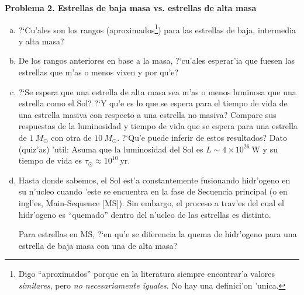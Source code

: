 \documentclass{article}
\begin{document}
\textbf{Problema 2. Estrellas de baja masa vs. estrellas de alta masa}

\vspace{3mm}


\begin{enumerate}[a)]
\item ?`Cu'ales son los rangos (aproximados\footnote{Digo ``aproximados'' porque en la literatura siempre encontrar'a valores \emph{similares}, pero \emph{no necesariamente iguales}. No hay una definici'on 'unica.}) para las estrellas de baja, intermedia y alta masa?

\item De los rangos anteriores en base a la masa, ?`cu'ales esperar'ia que fuesen las estrellas que m'as o menos viven y por qu'e?


\item ?`Se espera que una estrella de alta masa sea m'as o menos luminosa que una estrella como el Sol? ?`Y qu'e es lo que se espera para el tiempo de vida de una estrella masiva con respecto a una estrella no masiva? Compare sus respuestas de la luminosidad y tiempo de vida que se espera para una estrella de $1 \ M_\odot$ con otra de $10 \ M_\odot$. ?`Qu'e puede inferir de estos resultados? Dato (quiz'as) 'util: Asuma que la luminosidad del Sol es $L \sim 4 \times 10^{26} \ \text{W}$ y su tiempo de vida es $\tau_\odot \approx 10^{10} \ \text{yr}$.

\item Hasta donde sabemos, el Sol est'a constantemente fusionando hidr'ogeno en su n'ucleo cuando 'este se encuentra en la fase de Secuencia principal (o en ingl'es, Main-Sequence [MS]). Sin embargo, el proceso a trav'es del cual el hidr'ogeno es ``quemado'' dentro del n'ucleo de las estrellas es distinto. 

Para estrellas en MS, ?`en qu'e se diferencia la quema de hidr'ogeno para una estrella de baja masa con una de alta masa?





\end{enumerate}
\end{document}
